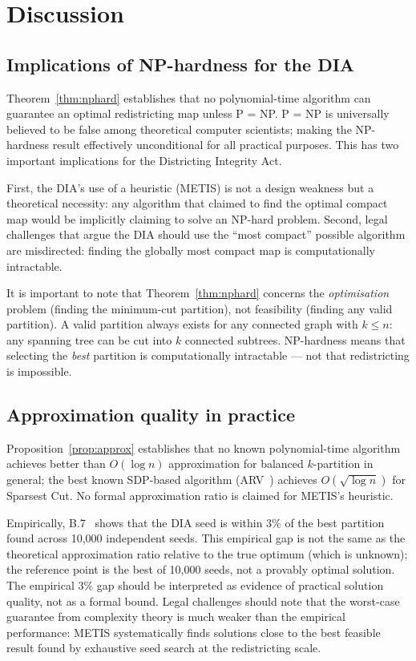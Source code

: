 \section{Discussion}
\label{sec:discussion}

\subsection{Implications of NP-hardness for the DIA}

Theorem~\ref{thm:nphard} establishes that no polynomial-time algorithm
can guarantee an optimal redistricting map unless P = NP.
P = NP is universally believed to be false among theoretical computer
scientists; making the NP-hardness result effectively unconditional for
all practical purposes.
This has two important implications for the Districting Integrity Act.

First, the DIA's use of a heuristic (METIS) is not a design weakness but
a theoretical necessity: any algorithm that claimed to find the optimal
compact map would be implicitly claiming to solve an NP-hard problem.
Second, legal challenges that argue the DIA should use the ``most compact''
possible algorithm are misdirected: finding the globally most compact map
is computationally intractable.

It is important to note that Theorem~\ref{thm:nphard} concerns the
\emph{optimisation} problem (finding the minimum-cut partition), not
feasibility (finding any valid partition).
A valid partition always exists for any connected graph with $k \leq n$:
any spanning tree can be cut into $k$ connected subtrees.
NP-hardness means that selecting the \emph{best} partition is
computationally intractable --- not that redistricting is impossible.

\subsection{Approximation quality in practice}

Proposition~\ref{prop:approx} establishes that no known polynomial-time
algorithm achieves better than $O(\log n)$ approximation for balanced
$k$-partition in general; the best known SDP-based algorithm
(ARV~\citep{arora2009expander}) achieves $O(\sqrt{\log n})$ for Sparsest
Cut.  No formal approximation ratio is claimed for METIS's heuristic.

Empirically, B.7~\citep{b7paper} shows that the DIA seed is within 3\%
of the best partition found across 10,000 independent seeds.
This empirical gap is not the same as the theoretical approximation ratio
relative to the true optimum (which is unknown); the reference point is
the best of 10,000 seeds, not a provably optimal solution.
The empirical 3\% gap should be interpreted as evidence of practical
solution quality, not as a formal bound.
Legal challenges should note that the worst-case guarantee from complexity
theory is much weaker than the empirical performance: METIS
systematically finds solutions close to the best feasible result found
by exhaustive seed search at the redistricting scale.

